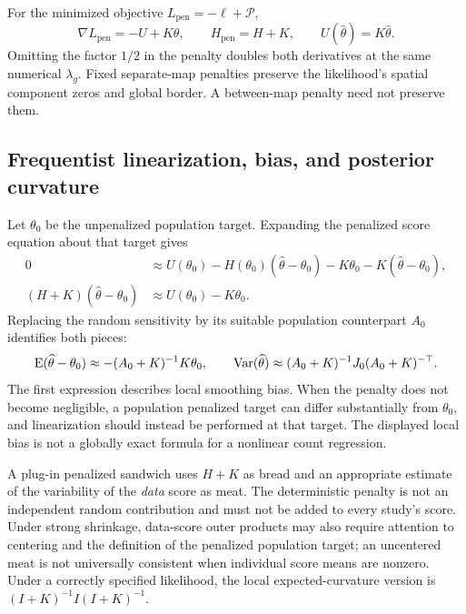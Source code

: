 For the minimized objective $L_{\mathrm{pen}}=-\ell+\mathcal P$,
\begin{equation}
 \nabla L_{\mathrm{pen}}=-U+K\theta,\qquad
 H_{\mathrm{pen}}=H+K,\qquad U(\widehat\theta)=K\widehat\theta .
 \label{cov-penalized-equation}
\end{equation}
Omitting the factor $1/2$ in the penalty doubles both derivatives at the
same numerical $\lambda_g$.  Fixed separate-map penalties preserve
the likelihood's spatial component zeros and global border.  A
between-map penalty need not preserve them.

\subsection{Frequentist linearization, bias, and posterior curvature}
\label{cov-penalty-uncertainty}

Let $\theta_0$ be the unpenalized population target.  Expanding the
penalized score equation about that target gives
\begin{align}
 0&\approx U(\theta_0)-H(\theta_0)(\widehat\theta-\theta_0)
                   -K\theta_0-K(\widehat\theta-\theta_0),\\
 (H+K)(\widehat\theta-\theta_0)&\approx U(\theta_0)-K\theta_0 .
 \label{cov-penalty-linearization}
\end{align}
Replacing the random sensitivity by its suitable population counterpart
$A_0$ identifies both pieces:
\[
 \operatorname{E}(\widehat\theta-\theta_0)
       \approx-(A_0+K)^{-1}K\theta_0,\qquad
 \operatorname{Var}(\widehat\theta)\approx
       (A_0+K)^{-1}J_0(A_0+K)^{-\top}.
\]
The first expression describes local smoothing bias.  When the penalty
does not become negligible, a population penalized target can differ
substantially from $\theta_0$, and linearization should instead be
performed at that target.  The displayed local bias is not a globally
exact formula for a nonlinear count regression.

A plug-in penalized sandwich uses $H+K$ as bread and an appropriate
estimate of the variability of the \emph{data} score as meat.  The
deterministic penalty is not an independent random contribution and
must not be added to every study's score.  Under strong shrinkage,
data-score outer products may also require attention to centering and
the definition of the penalized population target; an uncentered meat
is not universally consistent when individual score means are nonzero.
Under a correctly specified likelihood, the local expected-curvature
version is $(I+K)^{-1}I(I+K)^{-1}$.

